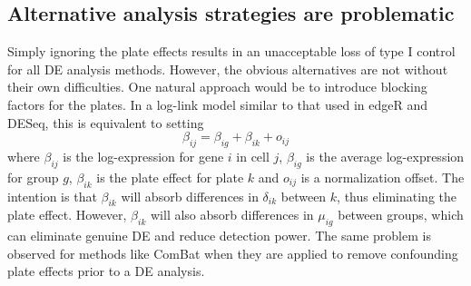 \documentclass[oupdraft]{bio}
\begin{document}
\subsection{Alternative analysis strategies are problematic}
Simply ignoring the plate effects results in an unacceptable loss of type I control for all DE analysis methods.
However, the obvious alternatives are not without their own difficulties.
One natural approach would be to introduce blocking factors for the plates.
In a log-link model similar to that used in edgeR and DESeq, this is equivalent to setting
\[
    \beta_{ij} = \beta_{ig} + \beta_{ik} + o_{ij}
\]
where $\beta_{ij}$ is the log-expression for gene $i$ in cell $j$, $\beta_{ig}$ is the average log-expression for group $g$, 
    $\beta_{ik}$ is the plate effect for plate $k$ and $o_{ij}$ is a normalization offset.
The intention is that $\beta_{ik}$ will absorb differences in $\delta_{ik}$ between $k$, thus eliminating the plate effect.
However, $\beta_{ik}$ will also absorb differences in $\mu_{ig}$ between groups, which can eliminate genuine DE and reduce detection power.
The same problem is observed for methods like ComBat \citep{johnson2007adjusting} when they are applied to remove confounding plate effects prior to a DE analysis.
\end{document}
